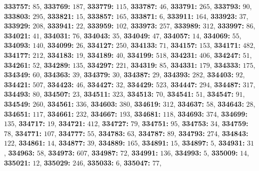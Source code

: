 \textsf{\bfseries 333757:} $85$, \textsf{\bfseries 333769:} $187$, \textsf{\bfseries 333779:} $115$, \textsf{\bfseries 333787:} $46$, \textsf{\bfseries 333791:} $265$, \textsf{\bfseries 333793:} $90$, \textsf{\bfseries 333803:} $295$, \textsf{\bfseries 333821:} $15$, \textsf{\bfseries 333857:} $165$, \textsf{\bfseries 333871:} $6$, \textsf{\bfseries 333911:} $164$, \textsf{\bfseries 333923:} $37$, \textsf{\bfseries 333929:} $208$, \textsf{\bfseries 333941:} $22$, \textsf{\bfseries 333959:} $102$, \textsf{\bfseries 333973:} $257$, \textsf{\bfseries 333989:} $312$, \textsf{\bfseries 333997:} $86$, \textsf{\bfseries 334021:} $41$, \textsf{\bfseries 334031:} $76$, \textsf{\bfseries 334043:} $35$, \textsf{\bfseries 334049:} $47$, \textsf{\bfseries 334057:} $14$, \textsf{\bfseries 334069:} $55$, \textsf{\bfseries 334093:} $140$, \textsf{\bfseries 334099:} $26$, \textsf{\bfseries 334127:} $250$, \textsf{\bfseries 334133:} $71$, \textsf{\bfseries 334157:} $153$, \textsf{\bfseries 334171:} $482$, \textsf{\bfseries 334177:} $212$, \textsf{\bfseries 334183:} $19$, \textsf{\bfseries 334189:} $40$, \textsf{\bfseries 334199:} $518$, \textsf{\bfseries 334231:} $406$, \textsf{\bfseries 334247:} $51$, \textsf{\bfseries 334261:} $52$, \textsf{\bfseries 334289:} $135$, \textsf{\bfseries 334297:} $221$, \textsf{\bfseries 334319:} $85$, \textsf{\bfseries 334331:} $179$, \textsf{\bfseries 334333:} $175$, \textsf{\bfseries 334349:} $60$, \textsf{\bfseries 334363:} $39$, \textsf{\bfseries 334379:} $30$, \textsf{\bfseries 334387:} $29$, \textsf{\bfseries 334393:} $282$, \textsf{\bfseries 334403:} $92$, \textsf{\bfseries 334421:} $507$, \textsf{\bfseries 334423:} $46$, \textsf{\bfseries 334427:} $32$, \textsf{\bfseries 334429:} $523$, \textsf{\bfseries 334447:} $294$, \textsf{\bfseries 334487:} $317$, \textsf{\bfseries 334493:} $80$, \textsf{\bfseries 334507:} $23$, \textsf{\bfseries 334511:} $323$, \textsf{\bfseries 334513:} $70$, \textsf{\bfseries 334541:} $51$, \textsf{\bfseries 334547:} $91$, \textsf{\bfseries 334549:} $260$, \textsf{\bfseries 334561:} $336$, \textsf{\bfseries 334603:} $380$, \textsf{\bfseries 334619:} $312$, \textsf{\bfseries 334637:} $58$, \textsf{\bfseries 334643:} $28$, \textsf{\bfseries 334651:} $117$, \textsf{\bfseries 334661:} $232$, \textsf{\bfseries 334667:} $193$, \textsf{\bfseries 334681:} $118$, \textsf{\bfseries 334693:} $374$, \textsf{\bfseries 334699:} $135$, \textsf{\bfseries 334717:} $19$, \textsf{\bfseries 334721:} $412$, \textsf{\bfseries 334727:} $79$, \textsf{\bfseries 334751:} $95$, \textsf{\bfseries 334753:} $34$, \textsf{\bfseries 334759:} $78$, \textsf{\bfseries 334771:} $107$, \textsf{\bfseries 334777:} $55$, \textsf{\bfseries 334783:} $63$, \textsf{\bfseries 334787:} $89$, \textsf{\bfseries 334793:} $274$, \textsf{\bfseries 334843:} $122$, \textsf{\bfseries 334861:} $14$, \textsf{\bfseries 334877:} $39$, \textsf{\bfseries 334889:} $165$, \textsf{\bfseries 334891:} $15$, \textsf{\bfseries 334897:} $5$, \textsf{\bfseries 334931:} $31$, \textsf{\bfseries 334963:} $58$, \textsf{\bfseries 334973:} $607$, \textsf{\bfseries 334987:} $72$, \textsf{\bfseries 334991:} $136$, \textsf{\bfseries 334993:} $5$, \textsf{\bfseries 335009:} $14$, \textsf{\bfseries 335021:} $12$, \textsf{\bfseries 335029:} $246$, \textsf{\bfseries 335033:} $6$, \textsf{\bfseries 335047:} $77$, 
